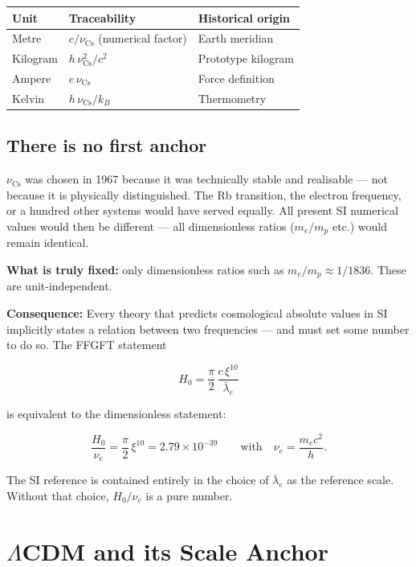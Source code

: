\begin{center}
\begin{tabular}{lll}
\toprule
Unit & Traceability & Historical origin \\
\midrule
Metre    & $c/\nu_\text{Cs}$ (numerical factor) & Earth meridian \\
Kilogram & $h\,\nu_\text{Cs}^2/c^2$ & Prototype kilogram \\
Ampere   & $e\,\nu_\text{Cs}$ & Force definition \\
Kelvin   & $h\,\nu_\text{Cs}/k_B$ & Thermometry \\
\bottomrule
\end{tabular}
\end{center}

\section{There is no first anchor}

$\nu_\text{Cs}$ was chosen in 1967 because it was technically stable
and realisable — not because it is physically distinguished. The Rb
transition, the electron frequency, or a hundred other systems would
have served equally. All present SI numerical values would then be
different — all dimensionless ratios ($m_e/m_p$ etc.) would remain
identical.

\textbf{What is truly fixed:} only dimensionless ratios such as
$m_e/m_p \approx 1/1836$. These are unit-independent.

\textbf{Consequence:} Every theory that predicts cosmological absolute
values in SI implicitly states a relation between two frequencies —
and must set some number to do so. The FFGFT statement

\[
  H_0 = \frac{\pi}{2}\,\frac{c\,\xi^{10}}{\bar\lambda_e}
\]

is equivalent to the dimensionless statement:

\[
  \frac{H_0}{\nu_e} = \frac{\pi}{2}\,\xi^{10} = 2.79\times10^{-39}
  \qquad\text{with}\quad \nu_e = \frac{m_e c^2}{h}.
\]

The SI reference is contained entirely in the choice of $\bar\lambda_e$
as the reference scale. Without that choice, $H_0/\nu_e$ is a pure
number.

\chapter{$\Lambda$CDM and its Scale Anchor}

